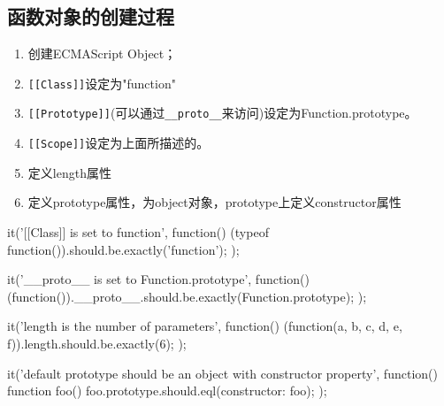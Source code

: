 \subsection{函数对象的创建过程}
\begin{enumerate}
\item 创建ECMAScript Object；
\item \lstinline![[Class]]!设定为"function"
\item \lstinline![[Prototype]]!(可以通过\lstinline!__proto__!来访问)设定为Function.prototype。
\item \lstinline![[Scope]]!设定为上面所描述的。
\item 定义length属性
\item 定义prototype属性，为object对象，prototype上定义constructor属性
\end{enumerate}
\begin{JavaScript}[此处是函数表达式]
		it('[[Class]] is set to function', function(){
			(typeof function(){}).should.be.exactly('function');
		});
\end{JavaScript}

\begin{JavaScript}
		it('__proto__ is set to Function.prototype', function(){
			(function(){}).__proto__.should.be.exactly(Function.prototype);
		});
\end{JavaScript}

\begin{JavaScript}
		it('length is the number of parameters', function(){
			(function(a, b, c, d, e, f){}).length.should.be.exactly(6);
		});
\end{JavaScript}

\begin{JavaScript}
		it('default prototype should be an object with constructor property', function(){
			function foo(){}
			foo.prototype.should.eql({constructor: foo});
		});
\end{JavaScript}

